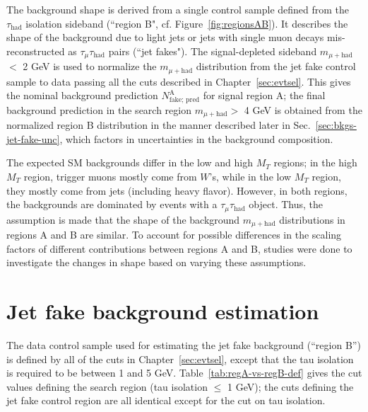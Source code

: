 The background shape is derived from a single control sample defined from the $\tau_{\text{had}}$ isolation sideband (``region B", cf. Figure~\ref{fig:regionsAB}).  It describes the shape of the background due to light jets or jets with single muon decays mis-reconstructed as $\tau_{\mu}\tau_{\text{had}}$ pairs (``jet fakes"). The signal-depleted sideband $m_{\mu+\text{had}}$ $<$ 2 GeV is used to normalize the $m_{\mu+\text{had}}$ distribution from the jet fake control sample to data passing all the cuts described in Chapter~\ref{sec:evtsel}.  This gives the nominal background prediction $N_{\text{fake; pred}}^{\text{A}}$ for signal region A; the final background prediction in the search region $m_{\mu+\text{had}} >$ 4 GeV is obtained from the normalized region B distribution in the manner described later in Sec.~\ref{sec:bkgs-jet-fake-unc}, which factors in uncertainties in the background composition.

The expected SM backgrounds differ in the low and high $M_{T}$ regions; in the high $M_{T}$ region, trigger muons mostly come from $W$'s, while in the low $M_{T}$ region, they mostly come from jets (including heavy flavor). However, in both regions, the backgrounds are dominated by events with a $\tau_{\mu}\tau_{\text{had}}$ object. Thus, the assumption is made that the shape of the background $m_{\mu+\text{had}}$ distributions in regions A and B are similar. To account for possible differences in the scaling factors of different contributions between regions A and B, studies were done to investigate the changes in shape based on varying these assumptions.

\section{Jet fake background estimation\label{sec:bkg-jetfake}}

The data control sample used for estimating the jet fake background (``region B'') is defined by all of the cuts in Chapter~\ref{sec:evtsel}, except that the tau isolation is required to be between 1 and 5 GeV.  Table~\ref{tab:regA-vs-regB-def} gives the cut values defining the search region (tau isolation $\le$ 1 GeV); the cuts defining the jet fake control region are all identical except for the cut on tau isolation.


